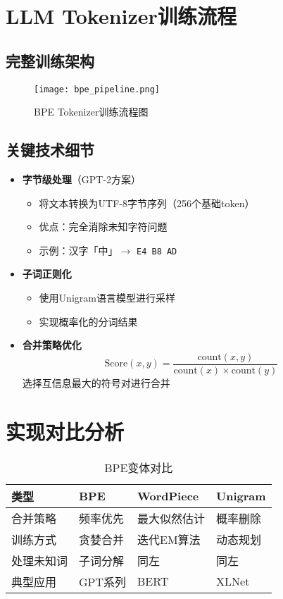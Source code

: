 \documentclass{article}
\begin{document}
\section{LLM Tokenizer训练流程}
\subsection{完整训练架构}
\begin{figure}[H]
\centering
\texttt{[image: bpe\_pipeline.png]}
\caption{BPE Tokenizer训练流程图}
\label{fig:pipe}
\end{figure}

\subsection{关键技术细节}
\begin{itemize}
    \item \textbf{字节级处理}（GPT-2方案）
    \begin{itemize}
        \item 将文本转换为UTF-8字节序列（256个基础token）
        \item 优点：完全消除未知字符问题
        \item 示例：汉字「中」$\rightarrow$ \texttt{E4 B8 AD}
    \end{itemize}
    
    \item \textbf{子词正则化}
    \begin{itemize}
        \item 使用Unigram语言模型进行采样
        \item 实现概率化的分词结果
    \end{itemize}
    
    \item \textbf{合并策略优化}
    \begin{equation}
    \text{Score}(x,y) = \frac{\text{count}(x,y)}{\text{count}(x) \times \text{count}(y)}
    \end{equation}
    选择互信息最大的符号对进行合并
\end{itemize}

\section{实现对比分析}
\begin{table}[H]
\centering
\caption{BPE变体对比}
\begin{tabularx}{\textwidth}{lXXX}
\toprule
\textbf{类型} & \textbf{BPE} & \textbf{WordPiece} & \textbf{Unigram} \\
\midrule
合并策略 & 频率优先 & 最大似然估计 & 概率删除 \\
训练方式 & 贪婪合并 & 迭代EM算法 & 动态规划 \\
处理未知词 & 子词分解 & 同左 & 同左 \\
典型应用 & GPT系列 & BERT & XLNet \\
\bottomrule
\end{tabularx}
\end{table}
\end{document}
